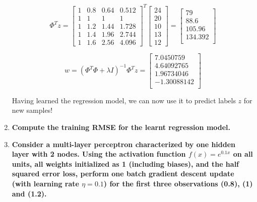 \documentclass[12pt]{article}
\begin{document}
\begin{enumerate}[leftmargin=\labelsep]
        \begin{equation*}
          \Phi^T z = \begin{bmatrix}
            1 & 0.8 & 0.64 & 0.512 \\
            1 & 1   & 1    & 1     \\
            1 & 1.2 & 1.44 & 1.728 \\
            1 & 1.4 & 1.96 & 2.744 \\
            1 & 1.6 & 2.56 & 4.096
          \end{bmatrix}^T
          \begin{bmatrix}
            24 \\
            20 \\
            10 \\
            13 \\
            12
          \end{bmatrix} = \begin{bmatrix}
            79      \\
            88.6    \\
            105.96  \\
            134.392 \\
          \end{bmatrix}
        \end{equation*}

        \begin{equation*}
          w = (\Phi^T \Phi + \lambda I)^{-1} \Phi^T z = \begin{bmatrix}
            7.0450759   \\
            4.64092765  \\
            1.96734046  \\
            -1.30088142 \\
          \end{bmatrix}
        \end{equation*}

        Having learned the regression model, we can now use it to predict labels $z$
        for new samples!

        \pagebreak

  \item \textbf{Compute the training RMSE for the learnt regression model.}

        \pagebreak

  \item \textbf{Consider a multi-layer perceptron characterized by one hidden layer with 2 nodes.
          Using the activation function $f(x) = e^{0.1x}$ on all units, all weights
          initialized as 1 (including biases), and the half squared error loss, perform
          one batch gradient descent update (with learning rate $\eta = 0.1$)
          for the first three observations (0.8), (1) and (1.2).
        }

\end{enumerate}
\end{document}
